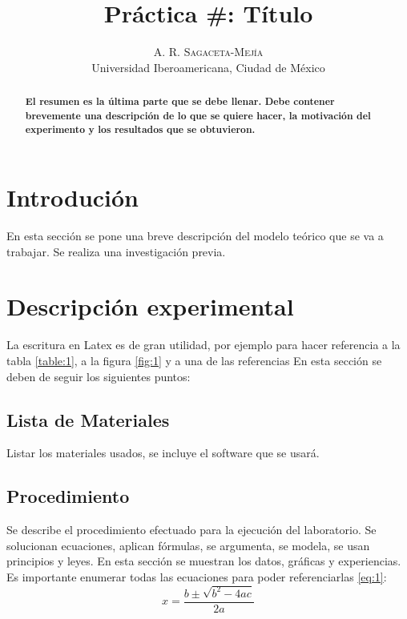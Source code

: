 \documentclass[twoside]{article} %
\title{\vspace{-18mm}\fontsize{18pt}{20pt}\selectfont\textbf{Práctica \#:} T\'itulo}
\author{
\large
\textsc{A. R. Sagaceta-Mej\'ia}\\[2mm]
\large Universidad Iberoamericana, Ciudad de M\'exico
}
\date{}
\begin{document}
\maketitle

\thispagestyle{fancy} 
 

\begin{abstract}
\textbf{El resumen es la última parte que se debe llenar. Debe contener brevemente una descripción de lo que se quiere hacer, la motivación del experimento y los resultados que se obtuvieron.}
\end{abstract}
%
\vspace{0.5cm}
\begin{multicols}{2}

\section{Introduci\'on}

En esta sección se pone una breve descripción del modelo teórico que se va a trabajar. Se realiza una investigación previa.

\section{Descripci\'on experimental}

La escritura en Latex es de gran utilidad, por ejemplo para hacer referencia a la tabla \ref{table:1}, a la figura \ref{fig:1} y a una de las referencias \cite{ref1}
En esta sección se deben de seguir los siguientes puntos:

\subsection*{Lista de Materiales}
Listar los materiales usados, se incluye el software que se usará.

\subsection*{Procedimiento}
Se describe el procedimiento efectuado para la ejecución del laboratorio. Se solucionan ecuaciones, aplican fórmulas, se argumenta, se modela, se usan principios y leyes. En esta sección se muestran los datos, gráficas y experiencias. Es importante enumerar todas las ecuaciones para poder referenciarlas \ref{eq:1}:
\begin{equation}
x=\frac{b\pm\sqrt{b^2-4ac}}{2a}
	\label{eq:2}
\end{equation}


\end{multicols}
\end{document}
